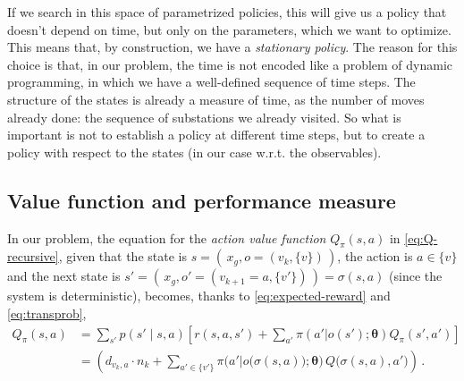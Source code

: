If we search in this space of parametrized policies, this will give us a policy that doesn't depend on time, but only on the parameters, which we want to optimize. This means that, by construction, we have a \emph{stationary policy}. The reason for this choice is that, in our problem, the time is not encoded like a problem of dynamic programming, in which we have a well-defined sequence of time steps. The structure of the states is already a measure of time, as the number of moves already done: the sequence of substations we already visited. So what is important is not to establish a policy at different time steps, but to create a policy with respect to the states (in our case w.r.t. the observables).


\subsection{Value function and performance measure}

In our problem, the equation for the \emph{action value function} $Q_\pi(s,a)$ in \eqref{eq:Q-recursive}, given that the state is $s = ( \, x_g, o = (v_k, \{v\}) \, )$, the action is $a \in \{v\}$ and the next state is $s' = ( \, x_g, o' = (v_{k+1}=a, \{v'\}) \, ) = \sigma(s,a)$ (since the system is deterministic), becomes, thanks to \eqref{eq:expected-reward} and \eqref{eq:transprob},
\begin{equation}
    \begin{aligned}
        Q_\pi(s,a)
        &= \sum_{s'} p(s' \mid s, a) \left[ r(s,a,s') + \sum_{a'} \pi(a'|o(s'); \boldsymbol \theta)  Q_\pi (s', a') \right] \\
        &= \left(d_{v_k, a} \cdot n_{k} + \sum_{a' \in \{v'\}} \pi \Big( a' \big| o \big( \sigma(s,a) \big); \boldsymbol \theta \Big) \, Q \big( \sigma(s,a), a' \big) \right) \, .
    \end{aligned}
    \label{eq:myQ}
\end{equation}

